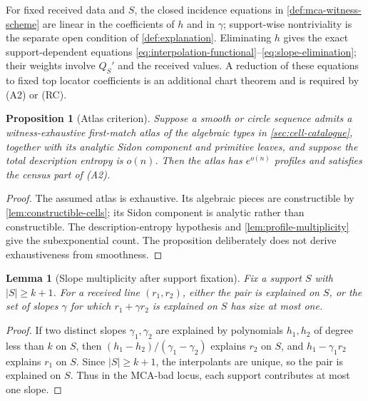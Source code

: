 \documentclass[12pt,a4paper]{amsart}
\numberwithin{equation}{section}
\newtheorem{proposition}[proposition]{Proposition}
\newtheorem{lemma}[lemma]{Lemma}
\theoremstyle{remark}
\newcommand{\abs}[1]{\lvert #1\rvert}
\begin{document}
For fixed received data and \(S\), the closed incidence equations in
\cref{def:mca-witness-scheme} are linear in the coefficients of \(h\) and
in \(\gamma\); support-wise nontriviality is the separate open condition
of \cref{def:explanation}.  Eliminating
\(h\) gives the exact support-dependent equations
\eqref{eq:interpolation-functional}--\eqref{eq:slope-elimination}; their
weights involve \(Q_S'\) and the received values.  A reduction of these
equations to fixed top locator coefficients is an additional chart theorem
and is required by \textup{(A2)} or \textup{(RC)}.

\begin{proposition}[Atlas criterion]\label{prop:first-match-atlas-finite}
Suppose a smooth or circle sequence admits a witness-exhaustive
first-match atlas
of the algebraic types in \cref{sec:cell-catalogue}, together with its
analytic Sidon component and primitive leaves, and suppose the total
description entropy is \(o(n)\).  Then the atlas has \(e^{o(n)}\) profiles
and satisfies the census part of \textup{(A2)}.
\end{proposition}

\begin{proof}
The assumed atlas is exhaustive.  Its algebraic pieces are constructible by
\cref{lem:constructible-cells}; its Sidon component is analytic rather than
constructible.  The description-entropy hypothesis and
\cref{lem:profile-multiplicity} give the subexponential count.  The
proposition deliberately does not derive exhaustiveness from smoothness.
\end{proof}

\begin{lemma}[Slope multiplicity after support fixation]\label{lem:slope-multiplicity-fixed-support}
Fix a support \(S\) with \(\abs S\ge k+1\).  For a received line \((r_1,r_2)\), either the pair is explained on \(S\), or the set of slopes \(\gamma\) for which \(r_1+\gamma r_2\) is explained on \(S\) has size at most one.
\end{lemma}

\begin{proof}
If two distinct slopes \(\gamma_1,\gamma_2\) are explained by polynomials \(h_1,h_2\) of degree less than \(k\) on \(S\), then \((h_1-h_2)/(\gamma_1-\gamma_2)\) explains \(r_2\) on \(S\), and \(h_1-\gamma_1 r_2\) explains \(r_1\) on \(S\).  Since \(\abs S\ge k+1\), the interpolants are unique, so the pair is explained on \(S\).  Thus in the MCA-bad locus, each support contributes at most one slope.
\end{proof}
\end{document}
